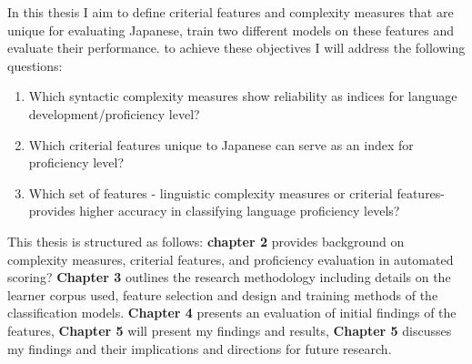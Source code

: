 In this thesis I aim to define criterial features and complexity measures that are unique for evaluating Japanese, train two different models on these features and evaluate their performance. to achieve these objectives I will address the following questions:
\begin{enumerate}
    \item Which syntactic complexity measures show reliability as indices for language development/proficiency level?
    \item Which criterial features unique to Japanese can serve as an index for proficiency level?
    \item Which set of features - linguistic complexity measures or criterial features- provides higher accuracy in classifying language proficiency levels?
\end{enumerate}

This thesis is structured as follows: \textbf{chapter 2} provides background on complexity measures, criterial
features, and proficiency evaluation in automated scoring? \textbf{Chapter 3} outlines the research methodology
including details on the learner corpus used, feature selection and design and training methods of the
classification models. \textbf{Chapter 4} presents an evaluation of initial findings of the features,
\textbf{Chapter 5 }will present my findings and results, \textbf{Chapter 5} discusses my
findings and their implications and directions for future research.